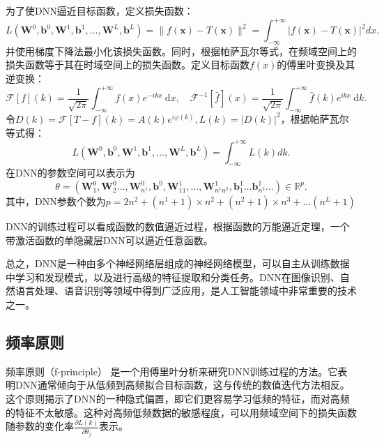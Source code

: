 为了使DNN逼近目标函数，定义损失函数：
\begin{equation}
    L\left(\boldsymbol{W}^{0}, \boldsymbol{b}^{0}, \boldsymbol{W}^{1}, \boldsymbol{b}^{1}, \ldots, \boldsymbol{W}^{L}, \boldsymbol{b}^{L}\right)=\|f(\boldsymbol{x})-T(\boldsymbol{x})\|^{2}=\int_{-\infty}^{+\infty}|f(\boldsymbol{x})-T(\boldsymbol{x})|^{2} dx.
\end{equation}
并使用梯度下降法最小化该损失函数。同时，根据帕萨瓦尔等式\cite{姚端正1997数学物理方法,hughes1965physical}，在频域空间上的损失函数等于其在时域空间上的损失函数。定义目标函数$f(x)$的傅里叶变换及其逆变换：
\begin{equation}
    \mathcal{F}[f](k)=\frac{1}{\sqrt{2 \pi}} \int_{-\infty}^{+\infty} f(x) e^{-i k x} \mathrm{~d} x, \quad \mathcal{F}^{-1}[\widehat{f}](x)=\frac{1}{\sqrt{2 \pi}} \int_{-\infty}^{+\infty} \hat{f}(k) e^{i k x} \mathrm{~d} k.
\end{equation}
令$D(k)=\mathcal{F}[T-f](k)=A(k) e^{i \varphi(k)}, L(k)=|D(k)|^{2}$，根据帕萨瓦尔等式得：
\begin{equation}
L\left(\boldsymbol{W}^0, \boldsymbol{b}^0, \boldsymbol{W}^1, \boldsymbol{b}^1, \ldots, \boldsymbol{W}^L, \boldsymbol{b}^L\right)=\int_{-\infty}^{+\infty} L(k) dk.
\end{equation}
在DNN的参数空间可以表示为
\begin{equation}
\theta=\left(\boldsymbol{W}_1^0, \boldsymbol{W}_2^0 \ldots, \boldsymbol{W}_{n^1}^0, \boldsymbol{b}^0, \boldsymbol{W}_{11}^1, \ldots, \boldsymbol{W}_{n^1 n^2}^1, \boldsymbol{b}_1^1 \ldots \boldsymbol{b}_{n^2}^1 \ldots\right) \in \mathbb{R}^p.
\end{equation}
其中，DNN参数个数为$p=2n^2+\left(n^1+1\right) \times n^2+\left(n^2+1\right) \times n^3+\ldots\left(n^L+1\right)$

DNN的训练过程可以看成函数的数值逼近过程，根据函数的万能逼近定理，一个带激活函数的单隐藏层DNN可以逼近任意函数\cite{cybenko1989approximation}。

总之，DNN是一种由多个神经网络层组成的神经网络模型，可以自主从训练数据中学习和发现模式，以及进行高级的特征提取和分类任务。DNN在图像识别、自然语言处理、语音识别等领域中得到广泛应用，是人工智能领域中非常重要的技术之一。
\subsection{频率原则}
频率原则（f-principle）\cite{xu2019frequency} 是一个用傅里叶分析来研究DNN训练过程的方法。它表明DNN通常倾向于从低频到高频拟合目标函数，这与传统的数值迭代方法相反。这个原则揭示了DNN的一种隐式偏置，即它们更容易学习低频的特征，而对高频的特征不太敏感。这种对高频低频数据的敏感程度，可以用频域空间下的损失函数随参数的变化率$\frac{\partial L(k)}{\partial \theta_j}$表示。

